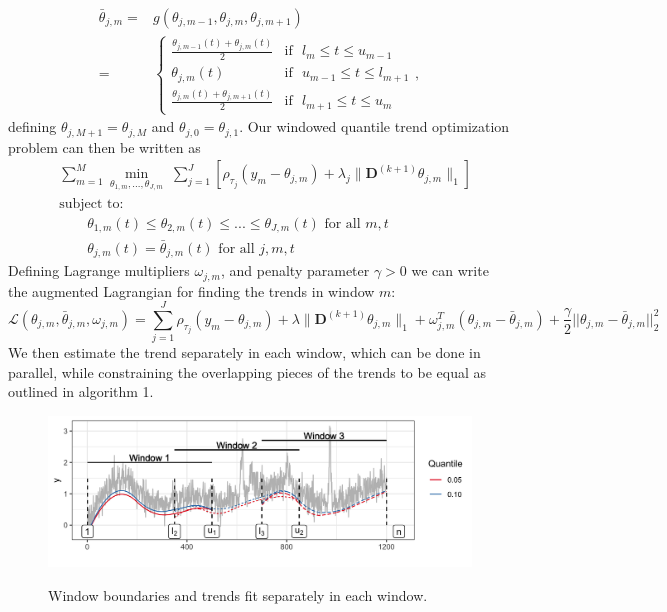 \documentclass[12pt]{article}
\begin{document}
	 \begin{align*}
		 \bar{\theta}_{j,m} =&  g(\theta_{j, m-1}, \theta_{j,m}, \theta_{j,m+1}) \\
		 =& \begin{cases} 
			 \frac{\theta_{j,m-1}(t)+\theta_{j,m}(t)}{2} & \mbox{if~~} l_{m} \le t \le u_{m-1}  \\
			 \theta_{j,m}(t) & \mbox{if~~} u_{m-1} \le t \le l_{m+1}  \\
			 \frac{\theta_{j,m}(t)+\theta_{j,m+1}(t)}{2} & \mbox{if~~} l_{m+1} \le t \le u_{m}  
			 \end{cases},
	\end{align*}
	defining $\theta_{j,M+1} = \theta_{j,M}$ and $\theta_{j,0} = \theta_{j,1}$. Our windowed quantile trend optimization problem can then be written as 
	 \begin{align*}
		 \label{eq:quantile_windows}
		 &\sum_{m=1}^M\underset{\theta_{1,m}, ..., \theta_{J,m}}{\min}\; \sum_{j=1}^J \left [\rho_{\tau_j}(y_m - \theta_{j,m}) + 
		 \lambda_j \lVert \mathbf{D}^{(k+1)} \theta_{j,m} \rVert_1 \right ] \\
		 &\text{subject to: }\; \\
		 &\qquad \theta_{1,m}(t) \le \theta_{2,m}(t) \le ... \le \theta_{J,m}(t) \text{ for all } m,t \\
		 &\qquad \theta_{j,m}(t) = \bar{\theta}_{j,m}(t) \text{ for all } j, m, t
	 \end{align*}
	 Defining Lagrange multipliers $\omega_{j,m}$, and penalty parameter $\gamma > 0$ we can write the augmented Lagrangian for finding the trends in window $m$:
	 \begin{equation*}
	 \mathcal{L}(\theta_{j,m}, \bar{\theta}_{j,m}, \omega_{j,m}) = \sum_{j=1}^J\rho_{\tau_j}(y_m - \theta_{j,m})+\lambda \lVert \mathbf{D}^{(k+1)}\theta_{j,m}\rVert_1 +  \omega_{j,m}^T(\theta_{j,m} - \bar{\theta}_{j,m}) + 
	 \frac{\gamma}{2}||\theta_{j,m} - \bar{\theta}_{j,m}||_2^2
	 \end{equation*}
	 We then estimate the trend separately in each window, which can be done in parallel, while constraining the overlapping pieces of the trends to be equal as outlined in algorithm 1. 
	 
	\begin{figure}[!h] 
		\centering
		\caption{Window boundaries and trends fit separately in each window.}
		\includegraphics[width = 0.8\linewidth]{Figures/overlapping_windows.png}
		\label{fig:windows}
	\end{figure}
\end{document}

